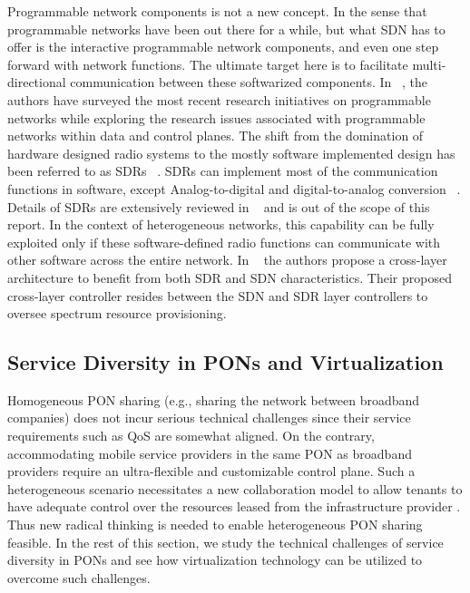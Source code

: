 Programmable network components is not a new concept. In the sense that programmable networks have been out there for a while, but what \ac{SDN} has to offer is the interactive programmable network components, and even one step forward with network functions. The ultimate target here is to facilitate multi-directional communication between these softwarized components. In ~\cite{Macedo2015}, the authors have surveyed the most recent research initiatives on programmable networks while exploring the research issues associated with programmable networks within data and control planes.
The shift from the domination of hardware designed radio systems to the mostly software implemented design has been referred to as \acp{SDR} ~\cite{267870}. \acp{SDR} can implement most of the communication functions in software, except Analog-to-digital and digital-to-analog conversion ~\cite{Macedo2015}. Details of \acp{SDR} are extensively reviewed in ~\cite{5462981,Macedo2015} and is out of the scope of this report. In the context of heterogeneous networks, this capability can be fully exploited only if these software-defined radio functions can communicate with other software across the entire network. In ~\cite{6895241} the authors propose a cross-layer architecture to benefit from both \ac{SDR} and \ac{SDN} characteristics. Their proposed cross-layer controller resides between the \ac{SDN} and \ac{SDR} layer controllers to oversee spectrum resource provisioning.

\subsection{Service Diversity in \acp{PON} and Virtualization}

Homogeneous \ac{PON} sharing (e.g., sharing the network between broadband companies) does not incur serious technical challenges since their service requirements such as \ac{QoS} are somewhat aligned. %
On the contrary, accommodating mobile service providers in the same \ac{PON} as broadband providers require an ultra-flexible and customizable control plane. Such a heterogeneous scenario necessitates a new collaboration model to allow tenants to have adequate control over the resources leased from the infrastructure provider \cite{Cornaglia20152}. Thus new radical thinking is needed to enable heterogeneous \ac{PON} sharing feasible. In the rest of this section, we study the technical challenges of service diversity in \acp{PON} and see how virtualization technology can be utilized to overcome such challenges.

